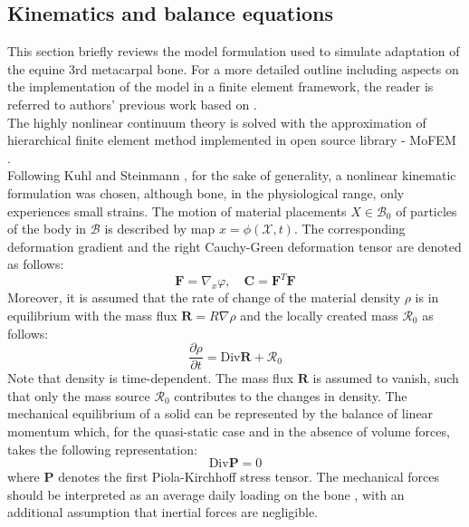 \documentclass[11pt]{ACMEarticle}
\numberwithin{equation}{section}
\begin{document}
\subsection{Kinematics and balance equations}
This section briefly reviews the model formulation used to simulate  adaptation of the equine 3rd metacarpal bone. For a more detailed outline including aspects on the implementation of the model in a finite element framework, the reader is referred to authors' previous work \cite{lewandowski2017} based on 
\citep{kuhl2003computational}.
\\
The highly nonlinear continuum theory is solved with the approximation of hierarchical finite element method implemented in open source library - MoFEM \citep{mofem2017}.  \\
Following Kuhl and Steinmann \citep{kuhl2003computational}, for the sake of generality, a nonlinear kinematic formulation was chosen, although bone, in the physiological range, only experiences small strains. The motion of material placements ${X} \in  \mathcal{B}_0 $ of particles of the body in $\mathcal{B}$ is described by map $x = \phi(\mathcal{X},t)$. The corresponding deformation gradient and the right Cauchy-Green deformation tensor are denoted as follows: 
\begin{equation}
\mathbf{F}=\nabla_{x}\varphi, \quad \mathbf{C}=\mathbf{F}^{T}\mathbf{F}
\end{equation}
Moreover, it is assumed that the rate of change of the material density $\rho$ is in equilibrium with the mass flux $\mathbf{R} = R\nabla\rho$ and the locally created mass $\mathcal{R}_0$ as follows: 
\begin{equation}
\frac{\partial\rho}{\partial t}=\mathrm{Div}\mathbf{R} + \mathcal{R}_0
\label{eq:mass_balance}
\end{equation}
Note that density is time-dependent. The mass flux $\mathbf{R}$ is assumed to vanish, such that only the mass source $\mathcal{R}_0$ contributes to the changes in density. 
The mechanical equilibrium of a solid can be represented by the balance of linear momentum which, for the quasi-static case and in the absence of volume forces, takes the following representation:
\begin{equation}
\text{Div}\mathbf{{\mathbf{P}}} = 0
\label{eq:momentum_balance}
\end{equation}
where $\mathbf{P}$ denotes the first Piola-Kirchhoff stress tensor. 
The mechanical forces should be interpreted as an average daily loading on the bone \citep{kuhl2003computational}, with an additional assumption that inertial forces are negligible. 
\end{document}
